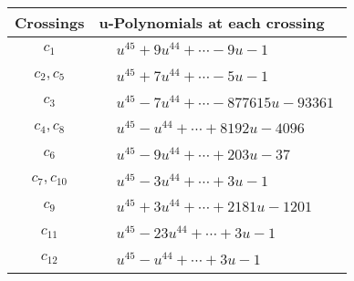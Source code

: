 \documentclass[1p]{elsarticle_modified}
\theoremstyle{definition}
\begin{document}
\begin{tabular}{m{50pt}|m{274pt}}
Crossings & \hspace{64pt}u-Polynomials at each crossing \\
\hline $$\begin{aligned}c_{1}\end{aligned}$$&$\begin{aligned}
&u^{45}+9 u^{44}+\cdots-9 u-1
\end{aligned}$\\
\hline $$\begin{aligned}c_{2},c_{5}\end{aligned}$$&$\begin{aligned}
&u^{45}+7 u^{44}+\cdots-5 u-1
\end{aligned}$\\
\hline $$\begin{aligned}c_{3}\end{aligned}$$&$\begin{aligned}
&u^{45}-7 u^{44}+\cdots-877615 u-93361
\end{aligned}$\\
\hline $$\begin{aligned}c_{4},c_{8}\end{aligned}$$&$\begin{aligned}
&u^{45}- u^{44}+\cdots+8192 u-4096
\end{aligned}$\\
\hline $$\begin{aligned}c_{6}\end{aligned}$$&$\begin{aligned}
&u^{45}-9 u^{44}+\cdots+203 u-37
\end{aligned}$\\
\hline $$\begin{aligned}c_{7},c_{10}\end{aligned}$$&$\begin{aligned}
&u^{45}-3 u^{44}+\cdots+3 u-1
\end{aligned}$\\
\hline $$\begin{aligned}c_{9}\end{aligned}$$&$\begin{aligned}
&u^{45}+3 u^{44}+\cdots+2181 u-1201
\end{aligned}$\\
\hline $$\begin{aligned}c_{11}\end{aligned}$$&$\begin{aligned}
&u^{45}-23 u^{44}+\cdots+3 u-1
\end{aligned}$\\
\hline $$\begin{aligned}c_{12}\end{aligned}$$&$\begin{aligned}
&u^{45}- u^{44}+\cdots+3 u-1
\end{aligned}$\\
\hline
\end{tabular}\\~\\
\end{document}
